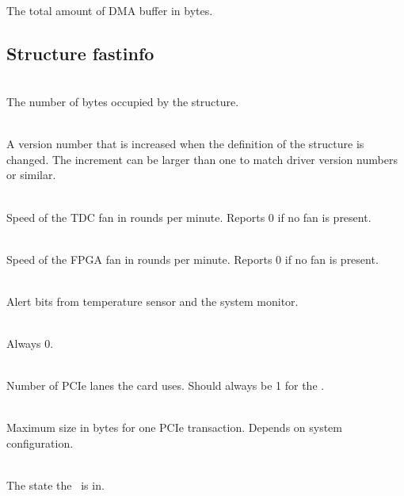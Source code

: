 \\
The total amount of DMA buffer in bytes.


\subsection{Structure \prefix fast\tu info}
\label{structfastinfo}
\\
The number of bytes occupied by the structure. \par

\\
A version number that is increased when the definition of the structure is changed. 
The increment can be larger than one to match driver version numbers or similar.\par

\ifxHPTDC{} {
    \\
    Speed of the TDC fan in rounds per minute. Reports 0 if no fan is present.\par
}
\\
Speed of the FPGA fan in rounds per minute. Reports 0 if no fan is present.\par

\\
Alert bits from temperature sensor and the system monitor.
\par

\\
Always 0. \par

\\
Number of PCIe lanes the card uses. Should always be 1 for the \deviceName. \par

\\
Maximum size in bytes for one PCIe transaction. Depends on system configuration.\par

\\
The state the \deviceName\ is in.

